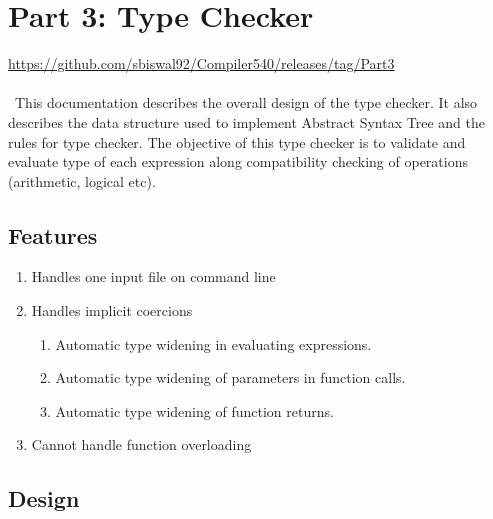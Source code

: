 \documentclass[12pt]{article}
\begin{document}
\section{Part 3: Type Checker} 

\url{https://github.com/sbiswal92/Compiler540/releases/tag/Part3}
\\~
\\~This documentation describes the overall design of the type checker. It also describes the data structure used to implement Abstract Syntax Tree and the rules for type checker. The objective of this type checker is to validate and evaluate type of each expression along compatibility checking of operations (arithmetic, logical etc).

\subsection{Features}
\label{Features}
\begin{enumerate}
\item Handles one input file on command line
\item Handles implicit coercions
\begin{enumerate}
\item Automatic type widening in evaluating expressions.
\item Automatic type widening of parameters in function calls.
\item Automatic type widening of function returns.
\end{enumerate}
\item Cannot handle function overloading
\end{enumerate}


\subsection{Design}
\end{document}
